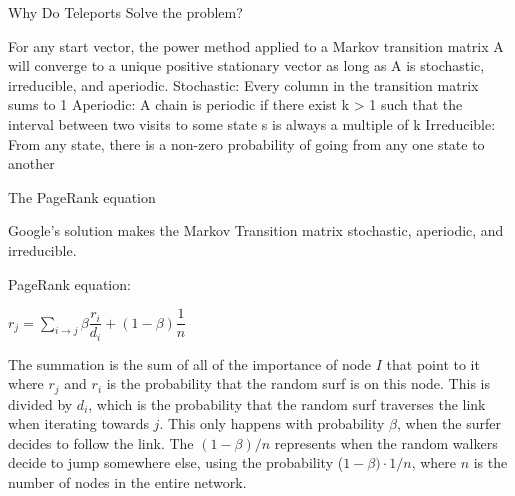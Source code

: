 \documentclass{beamer}
\begin{document}
\begin{frame}[t]{Why Do Teleports Solve the problem?}
\begin{outline}
\1 For any start vector, the power method applied to a Markov transition matrix A will converge to a unique positive stationary vector as long as A is stochastic, irreducible, and aperiodic.
    \2 Stochastic: Every column in the transition matrix sums to 1
    \2 Aperiodic: A chain is periodic if there exist k > 1 such that the interval between two visits to some state s is always a multiple of k
    \2 Irreducible: From any state, there is a non-zero probability of going from any one state to another
\end{outline}
\end{frame}
    
\begin{frame}[t]{The PageRank equation}
\begin{outline}
\1 Google's solution makes the Markov Transition matrix stochastic, aperiodic, and irreducible.

\1 PageRank equation:

\begin{mdframed}[backgroundcolor=blue!20]
    \begin{center}
        $r_j = \sum\limits_{i\to j}\beta \dfrac{r_i}{d_i} + (1-\beta)\dfrac{1}{n}$
    \end{center}
\end{mdframed}

\2 The summation is the sum of all of the importance of node $I$ that point to it where $r_j$ and $r_i$ is the probability that the random surf is on this node.
\2 This is divided by $d_i$, which is the probability that the random surf traverses the link when iterating towards $j$. This only happens with probability $\beta$, when the surfer decides to follow the link.
\2 The $(1-\beta)/n$ represents when the random walkers decide to jump somewhere else, using the probability ($1-\beta) \cdot 1/n$, where $n$ is the number of nodes in the entire network.
\end{outline}
\end{frame}
\end{document}
